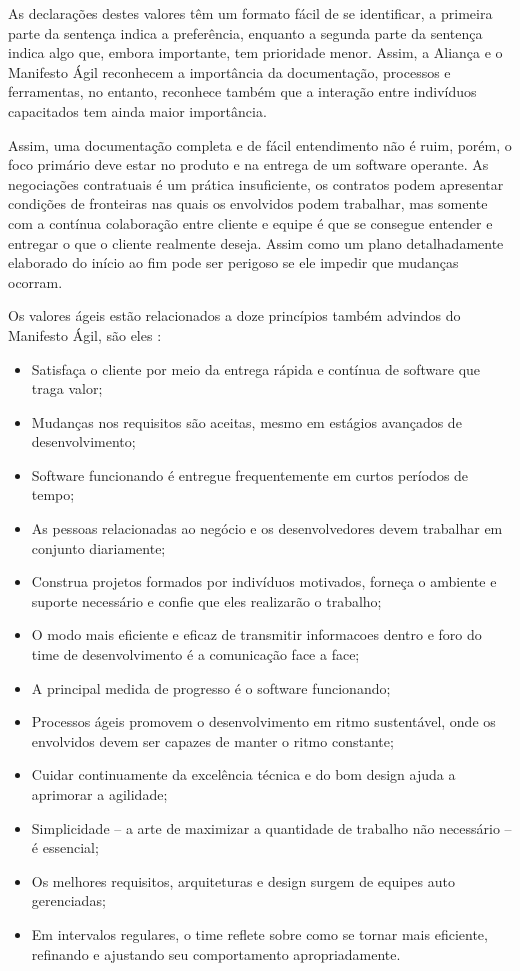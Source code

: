 As declarações destes valores têm um formato fácil de se identificar, a primeira parte da sentença indica a preferência, enquanto a segunda parte da sentença indica algo que, embora importante, tem prioridade menor. Assim, a Aliança e o Manifesto Ágil reconhecem a importância da documentação, processos e ferramentas, no entanto, reconhece também que a interação entre indivíduos capacitados tem ainda maior importância.

Assim, uma documentação completa e de fácil entendimento não é ruim, porém, o foco primário deve estar no produto e na entrega de um software operante. As negociações contratuais é um prática insuficiente, os contratos podem apresentar condições de fronteiras nas quais os envolvidos podem trabalhar, mas somente com a contínua colaboração entre cliente e equipe é que se consegue entender e entregar o que o cliente realmente deseja. Assim como um plano detalhadamente elaborado do início ao fim pode ser perigoso se ele impedir que mudanças ocorram.

Os valores ágeis estão relacionados a doze princípios também advindos do Manifesto Ágil, são eles \cite{manifesto}:
\begin{itemize}
\item Satisfaça o cliente por meio da entrega rápida e contínua de software que traga valor;
\item Mudanças nos requisitos são aceitas, mesmo em estágios avançados de desenvolvimento;
\item Software funcionando é entregue frequentemente em curtos períodos de tempo;
\item As pessoas relacionadas ao negócio e os desenvolvedores devem trabalhar em conjunto diariamente;
\item Construa projetos formados por indivíduos motivados, forneça o ambiente e suporte necessário e confie que eles realizarão o trabalho;
\item O modo mais eficiente e eficaz de transmitir informacoes dentro e foro do time de desenvolvimento é a comunicação face a face;
\item A principal medida de progresso é o software funcionando;
\item Processos ágeis promovem o desenvolvimento em ritmo sustentável, onde os envolvidos devem ser capazes de manter o ritmo constante;
\item Cuidar continuamente da excelência técnica e do bom design ajuda a aprimorar a agilidade;
\item Simplicidade – a arte de maximizar a quantidade de trabalho não necessário – é essencial;
\item Os melhores requisitos, arquiteturas e design surgem de equipes auto gerenciadas;
\item Em intervalos regulares, o time reflete sobre como se tornar mais eficiente, refinando e ajustando seu comportamento apropriadamente.
\end{itemize}

